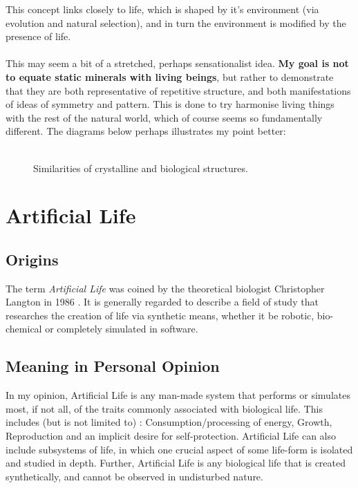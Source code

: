 \documentclass[10pt,a4paper]{article}
\begin{document}
				\bigskip
				This concept links closely to life, which is shaped by it's environment (via evolution and natural selection), and in turn the environment is modified by the presence of life.
				\\\\
				This may seem a bit of a stretched, perhaps sensationalist idea. \textbf{My goal is not to equate static minerals with living beings}, but rather to demonstrate that they are both representative of repetitive structure, and both manifestations of ideas of symmetry and pattern. This is done to try harmonise living things with the rest of the natural world, which of course seems so fundamentally different. The diagrams below perhaps illustrates my point better:
				\\\\
				\begin{figure}[h]
					\centering
					\qquad
					\caption{Similarities of crystalline and biological structures.}
					\label{fig:example}
				\end{figure}
				
		\pagebreak
		\section{Artificial Life}
		
			\subsection{Origins}
		
				The term \textsl{Artificial Life} was coined by the theoretical biologist Christopher Langton in 1986 \cite{artlife}. It is generally regarded to describe a field of study that researches the creation of life via synthetic means, whether it be robotic, bio-chemical or completely simulated in software.
		
			\subsection{Meaning in Personal Opinion}
		
				In my opinion, Artificial Life is any man-made system that performs or simulates most, if not all, of the traits commonly associated with biological life. This includes (but is not limited to) : Consumption/processing of energy, Growth, Reproduction and an implicit desire for self-protection. Artificial Life can also include subsystems of life, in which one crucial aspect of some life-form is isolated and studied in depth. Further, Artificial Life is any biological life that is created synthetically, and cannot be observed in undisturbed nature.
				
\end{document}
